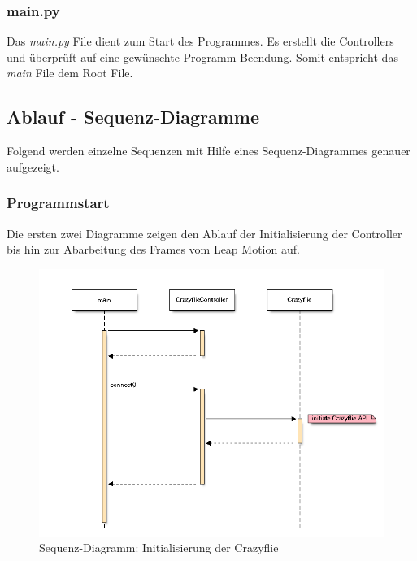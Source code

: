 \subsubsection{main.py}
Das \textit{main.py} File dient zum Start des Programmes. Es erstellt die Controllers und überprüft auf eine gewünschte Programm Beendung. Somit entspricht das \textit{main} File dem Root File.

\subsection{Ablauf - Sequenz-Diagramme}
Folgend werden einzelne Sequenzen mit Hilfe eines Sequenz-Diagrammes genauer aufgezeigt.

\subsubsection{Programmstart}
Die ersten zwei Diagramme zeigen den Ablauf der Initialisierung der Controller bis hin zur Abarbeitung des Frames vom Leap Motion auf.
\begin{figure}[H]
	\centering
	\includegraphics[width=1.0\textwidth]{figures/poc/seq_dia_crazyflie.png}
	\caption{Sequenz-Diagramm: Initialisierung der Crazyflie}
\end{figure}

